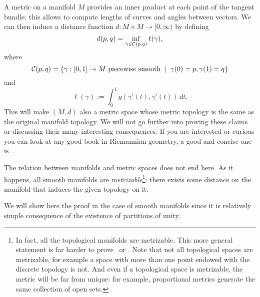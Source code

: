 A metric on a manifold $M$ provides an inner product at each point of the tangent bundle: this allows to compute lengths of curves and angles between vectors. We can then induce a distance function $d: M \times M \to [0, \infty)$ by defining
\begin{equation}
  d(p,q) = \inf_{\gamma \in \mathcal{C}(p,q)} \ell(\gamma),
\end{equation}
where
\begin{equation}
  \mathcal{C}(p,q) = \left\{\gamma : [0,1] \to M \mbox{ piecewise smooth} \;\mid\; \gamma(0)=p, \gamma(1)=q\right\}
\end{equation}
and
\begin{equation}
  \ell(\gamma) := \int_0^1 g(\gamma'(t), \gamma'(t))\, dt.
\end{equation}
This will make $(M, d)$ also a metric space whose metric topology is the same as the original manifold topology.
We will not go further into proving these claims or discussing their many interesting consequences.
If you are interested or curious you can look at any good book in Riemannian geometry,
a good and concise one is \cite[Chapter 6]{book:lee:riemannian}.

The relation between manifolds and metric spaces does not end here. As it happens, all smooth manifolds are \emph{metrizable}\footnote{In fact, all the topological manifolds are metrizable. This more general statement is far harder to prove~\cite[Theorem 34.1 and Exercise 1 of Chapter 4.36]{book:munkres:topology} or \cite{nlab:urysohn_metrization_theorem}. Note that not all topological spaces are metrizable, for example a space with more than one point endowed with the discrete topology is not. And even if a topological space is metrizable, the metric will be far from unique: for example, proportional metrics generate the same collection of open sets.}: there exists some distance on the manifold that induces the given topology on it.

We will show here the proof in the case of smooth manifolds since it is relatively simple consequence of the existence of partitions of unity.

